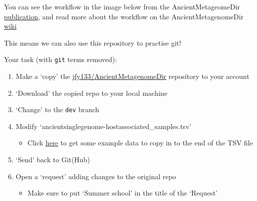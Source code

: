 \documentclass[
  letterpaper,
]{book}
\providecommand{\tightlist}{%
  \setlength{\itemsep}{0pt}\setlength{\parskip}{0pt}}\usepackage{longtable,booktabs,array}
\begin{document}
You can see the workflow in the image below from the AncientMetageomeDir
\href{https://doi.org/10.1038/s41597-021-00816-y}{publication}, and read
more about the workflow on the AncientMetagenomeDir
\href{https://github.com/SPAAM-community/AncientMetagenomeDir/wiki}{wiki}

This means we can also use this repository to practise git!

Your task (with \texttt{git} terms removed):

\begin{enumerate}
\def\labelenumi{\arabic{enumi}.}
\tightlist
\item
  Make a `copy' the
  \href{https://github.com/jfy133/AncientMetagenomeDir}{jfy133/AncientMetagenomeDir}
  repository to your account
\item
  `Download' the copied repo to your local machine
\item
  `Change' to the \texttt{dev} branch
\item
  Modify `ancientsinglegenome-hostassociated\_samples.tsv'

  \begin{itemize}
  \tightlist
  \item
    Click
    \href{https://github.com/SPAAM-community/https://github.com/SPAAM-community/wss-summer-school/raw/main/docs/raw/main/docs/assets/data/2022/ancientmetagenomedir_example.tsv}{here}
    to get some example data to copy in to the end of the TSV file
  \end{itemize}
\item
  `Send' back to Git(Hub)
\item
  Open a `request' adding changes to the original repo

  \begin{itemize}
  \tightlist
  \item
    Make sure to put `Summer school' in the title of the `Request'
  \end{itemize}
\end{enumerate}
\end{document}
